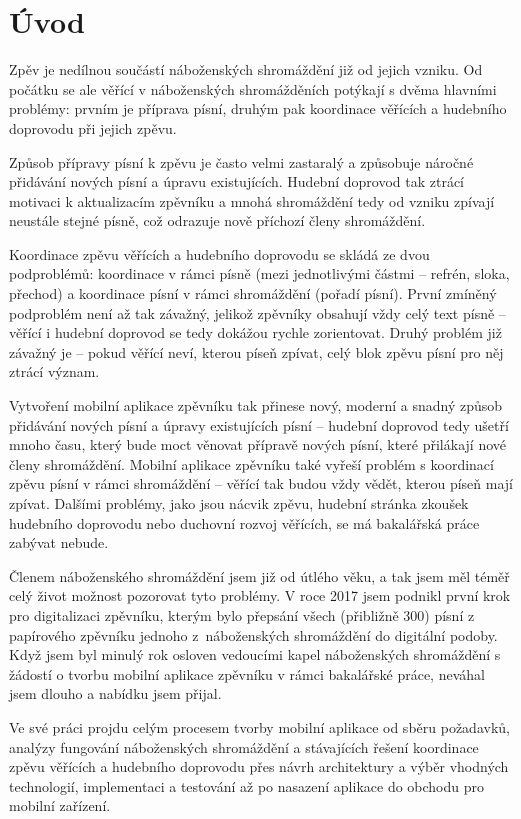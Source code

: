 \chapter*{Úvod}
\label{uvod}

\setcounter{page}{1}

Zpěv je nedílnou součástí náboženských shromáždění již od jejich vzniku. Od počátku se ale věřící v náboženských shromážděních potýkají s dvěma hlavními problémy: prvním je příprava písní, druhým pak koordinace věřících a hudebního doprovodu při jejich zpěvu.

Způsob přípravy písní k zpěvu je často velmi zastaralý a způsobuje náročné přidávání nových písní a úpravu existujících. Hudební doprovod tak ztrácí motivaci k aktualizacím zpěvníku a mnohá shromáždění tedy od vzniku zpívají neustále stejné písně, což odrazuje nově příchozí členy shromáždění.

Koordinace zpěvu věřících a hudebního doprovodu se skládá ze dvou podproblémů: koordinace v rámci písně (mezi jednotlivými částmi -- refrén, sloka, přechod) a koordinace písní v rámci shromáždění (pořadí písní). První zmíněný podproblém není až tak závažný, jelikož zpěvníky obsahují vždy celý text písně -- věřící i hudební doprovod se tedy dokážou rychle zorientovat. Druhý problém již závažný je -- pokud věřící neví, kterou píseň zpívat, celý blok zpěvu písní pro něj ztrácí význam.

Vytvoření mobilní aplikace zpěvníku tak přinese nový, moderní a snadný způsob přidávání nových písní a úpravy existujících písní -- hudební doprovod tedy ušetří mnoho času, který bude moct věnovat přípravě nových písní, které přilákají nové členy shromáždění. Mobilní aplikace zpěvníku také vyřeší problém s koordinací zpěvu písní v rámci shromáždění -- věřící tak budou vždy vědět, kterou píseň mají zpívat. Dalšími problémy, jako jsou nácvik zpěvu, hudební stránka zkoušek hudebního doprovodu nebo duchovní rozvoj věřících, se má bakalářská práce zabývat nebude.

Členem náboženského shromáždění jsem již od útlého věku, a tak jsem měl téměř celý život možnost pozorovat tyto problémy. V roce 2017 jsem podnikl první krok pro digitalizaci zpěvníku, kterým bylo přepsání všech (přibližně 300) písní z papírového zpěvníku jednoho z~náboženských shromáždění do digitální podoby. Když jsem byl minulý rok osloven vedoucími kapel náboženských shromáždění s žádostí o tvorbu mobilní aplikace zpěvníku v rámci bakalářské práce, neváhal jsem dlouho a nabídku jsem přijal.

Ve své práci projdu celým procesem tvorby mobilní aplikace od sběru požadavků, analýzy fungování náboženských shromáždění a stávajících řešení koordinace zpěvu věřících a hudebního doprovodu přes návrh architektury a výběr vhodných technologií, implementaci a testování až po nasazení aplikace do obchodu pro mobilní zařízení.
